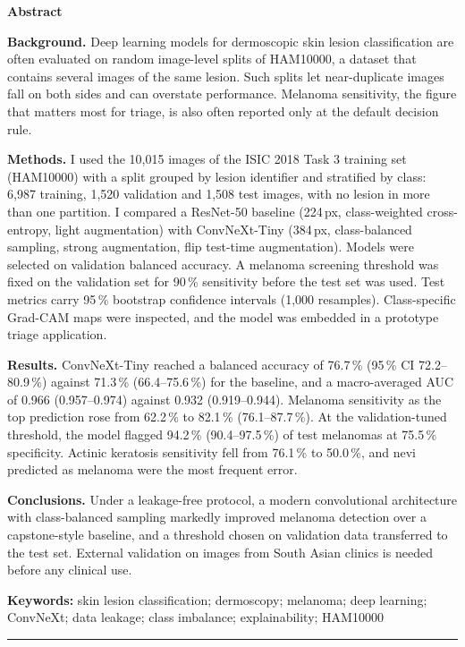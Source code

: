 \documentclass[11pt,a4paper]{article}
\newcommand{\pct}{\,\%}
\begin{document}
{\small
\textbf{Abstract}

\textbf{Background.} Deep learning models for dermoscopic skin lesion classification are often evaluated on random image-level splits of HAM10000, a dataset that contains several images of the same lesion. Such splits let near-duplicate images fall on both sides and can overstate performance. Melanoma sensitivity, the figure that matters most for triage, is also often reported only at the default decision rule.

\textbf{Methods.} I used the 10,015 images of the ISIC 2018 Task 3 training set (HAM10000) with a split grouped by lesion identifier and stratified by class: 6,987 training, 1,520 validation and 1,508 test images, with no lesion in more than one partition. I compared a ResNet-50 baseline (224\,px, class-weighted cross-entropy, light augmentation) with ConvNeXt-Tiny (384\,px, class-balanced sampling, strong augmentation, flip test-time augmentation). Models were selected on validation balanced accuracy. A melanoma screening threshold was fixed on the validation set for 90\pct{} sensitivity before the test set was used. Test metrics carry 95\pct{} bootstrap confidence intervals (1,000 resamples). Class-specific Grad-CAM maps were inspected, and the model was embedded in a prototype triage application.

\textbf{Results.} ConvNeXt-Tiny reached a balanced accuracy of 76.7\pct{} (95\pct{} CI 72.2--80.9\pct) against 71.3\pct{} (66.4--75.6\pct) for the baseline, and a macro-averaged AUC of 0.966 (0.957--0.974) against 0.932 (0.919--0.944). Melanoma sensitivity as the top prediction rose from 62.2\pct{} to 82.1\pct{} (76.1--87.7\pct). At the validation-tuned threshold, the model flagged 94.2\pct{} (90.4--97.5\pct) of test melanomas at 75.5\pct{} specificity. Actinic keratosis sensitivity fell from 76.1\pct{} to 50.0\pct, and nevi predicted as melanoma were the most frequent error.

\textbf{Conclusions.} Under a leakage-free protocol, a modern convolutional architecture with class-balanced sampling markedly improved melanoma detection over a capstone-style baseline, and a threshold chosen on validation data transferred to the test set. External validation on images from South Asian clinics is needed before any clinical use.

\textbf{Keywords:} skin lesion classification; dermoscopy; melanoma; deep learning; ConvNeXt; data leakage; class imbalance; explainability; HAM10000
}

\noindent\rule{\textwidth}{0.4pt}
\end{document}

